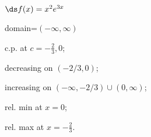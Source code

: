 {$\ds f(x) =x^2 e^{3x}$
}
{domain=$(-\infty,\infty)$

c.p. at $c=-\frac{2}{3},0$; 

decreasing on $(-2/3,0)$;

increasing on $(-\infty,-2/3)\cup (0,\infty)$;

rel. min at $x=0$;

rel. max at $x=-\frac{2}{3}$.
}
